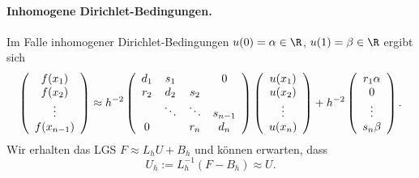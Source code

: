 \documentclass[
]{mycourse}
\theoremstyle{mythm}
\theoremstyle{break}
\begin{document}
\paragraph{Inhomogene Dirichlet-Bedingungen.} 
Im Falle inhomogener Dirichlet-Bedingungen $u(0)=\alpha\in \R$, $u(1)=\beta\in \R$ ergibt sich
\[
\left( \begin{array}{c} f(x_1)\\ f(x_2)\\ \vdots \\ f(x_{n-1}) \end{array}\right)
\approx h^{-2} \left( \begin{array}{c c c c} d_1 & s_1 &  & 0\\ r_2 & d_2 & s_2 \\ & \ddots & \ddots & s_{n-1}\\ 0  &  & r_{n} & d_{n}\end{array}\right) 
\left( \begin{array}{c} u(x_1)\\ u(x_2)\\ \vdots \\ u(x_{n}) \end{array}\right)
+ h^{-2}
\left( \begin{array}{c} r_1 \alpha\\ 0 \\ \vdots \\ s_{n} \beta \end{array}\right).
\]
Wir erhalten das LGS $F\approx L_h U+B_h$ und können erwarten, dass \[
U_h:=L_h^{-1} (F-B_h)\approx U.
\]
\end{document}
